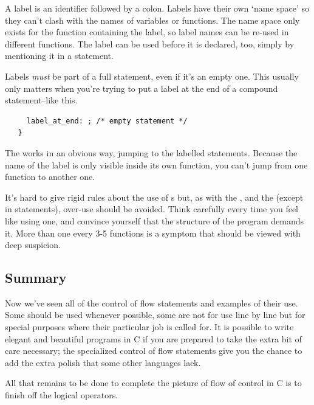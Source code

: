    A label is an identifier followed by a colon. Labels have their own
    `name space' so they can't clash with the names of variables or
    functions. The name space only exists for the function containing the
    label, so label names can be re-used in different functions. The label can
    be used before it is declared, too, simply by mentioning it in a
    \goto{} statement.


   Labels \textit{must} be part of a full statement, even if it's an empty
    one. This usually only matters when you're trying to put a label at the
    end of a compound statement--like this.


   \begin{Verbatim}
     label_at_end: ; /* empty statement */
   }
 \end{Verbatim}

   The \goto{} works in an obvious way, jumping to the labelled
    statements. Because the name of the label is only visible inside its own
    function, you can't jump from one function to another one.


   It's hard to give rigid rules about the use of \goto{}s but,
    as with the \kdo, \continue{} and the
    \kbreak{} (except in \switch{} statements), over-use
    should be avoided. Think carefully every time you feel like using one, and
    convince yourself that the structure of the program demands it. More than
    one \goto{} every 3-5 functions is a symptom that should
    be viewed with deep suspicion.


  

  \subsection{Summary}

   Now we've seen all of the control of flow statements and examples of
    their use. Some should be used whenever possible, some are not for use
    line by line but for special purposes where their particular job is called
    for. It is possible to write elegant and beautiful programs in C if you
    are prepared to take the extra bit of care necessary; the specialized
    control of flow statements give you the chance to add the extra polish
    that some other languages lack.


   All that remains to be done to complete the picture of flow of control
    in C is to finish off the logical operators.


  


